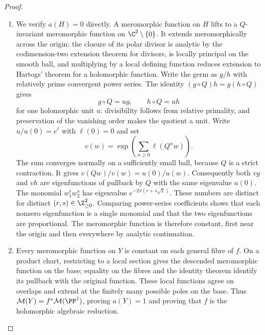 \begin{proof}
\begin{enumerate}[label={$\langle1\rangle$\arabic*.},leftmargin=*]
\item We verify $a(H)=0$ directly. A meromorphic function on $H$ lifts
to a $Q$-invariant meromorphic function on $\C^2\setminus\{0\}$.
It extends meromorphically across the origin: the closure of its
polar divisor is analytic by the codimension-two extension theorem
for divisors, is locally principal on the smooth ball, and
multiplying by a local defining function reduces extension to
Hartogs' theorem for a holomorphic function. Write the germ as
$g/h$ with relatively prime convergent power series. The identity
$(g\circ Q)h=g(h\circ Q)$ gives
\[
g\circ Q=ug,\qquad h\circ Q=uh
\]
for one holomorphic unit $u$: divisibility follows from relative
primality, and preservation of the vanishing order makes the
quotient a unit. Write $u/u(0)=e^\ell$ with $\ell(0)=0$ and set
\[
v(w)=\exp\left(\sum_{n\ge0}\ell(Q^nw)\right).
\]
The sum converges normally on a sufficiently small ball, because
$Q$ is a strict contraction. It gives
$v(Qw)/v(w)=u(0)/u(w)$. Consequently both $vg$ and $vh$ are
eigenfunctions of pullback by $Q$ with the same eigenvalue $u(0)$.
The monomial $w_1^rw_2^s$ has eigenvalue
$e^{-2\pi(r+s\sqrt2)}$. These numbers are distinct for distinct
$(r,s)\in\Z_{\ge0}^2$. Comparing power-series coefficients shows
that each nonzero eigenfunction is a single monomial and that the
two eigenfunctions are proportional. The meromorphic function is
therefore constant, first near the origin and then everywhere by
analytic continuation.

\item Every meromorphic function on $Y$ is constant on each general
fibre of $f$. On a product chart, restricting to a local section
gives the descended meromorphic function on the base; equality on
the fibres and the identity theorem identify its pullback with
the original function. These local functions agree on overlaps
and extend at the finitely many possible poles on the base.
Thus $\mathcal M(Y)=f^*\mathcal M(\PP^1)$, proving $a(Y)=1$
and proving that $f$ is the holomorphic algebraic reduction.


\end{enumerate}
\end{proof}
